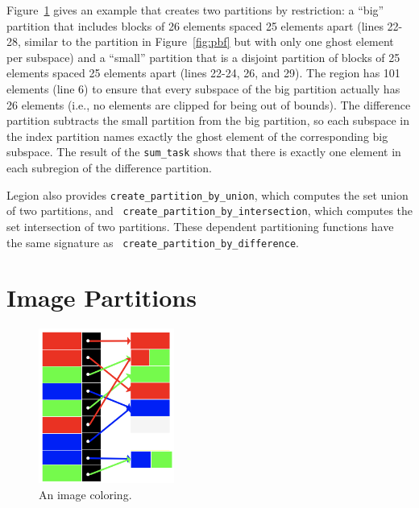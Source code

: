 Figure~\ref{fig:sets} gives an example that creates two partitions by restriction: a ``big'' partition that includes blocks of 26 elements spaced 25 elements apart (lines 22-28, similar to  the partition in Figure~\ref{fig:pbf} but with only one ghost element per subspace) and a ``small'' partition that is a disjoint partition of blocks of 25 elements spaced 25 elements apart (lines 22-24, 26, and 29). The region has 101 elements (line 6) to ensure that every subspace of the big partition actually has 26 elements (i.e., no elements are clipped for being out of bounds).  The difference partition subtracts the small partition from the big partition, so each subspace in the index partition names exactly the ghost element of the corresponding big subspace.  The result of the {\tt sum\_task} shows that there is exactly one element in each subregion of the difference partition.

Legion also provides {\tt create\_partition\_by\_union}, which
computes the set union of two partitions, and {\tt
  create\_partition\_by\_intersection}, which computes the set intersection
of two partitions.  These dependent
partitioning functions have the same signature as {\tt
  create\_partition\_by\_difference}.


\begin{figure}
  {\small
   
  }
  \caption{}
  \label{fig:sets}
\end{figure}


\section{Image Partitions}
\label{sec:image}

\begin{figure}
  \centering
  \includegraphics[height=2in]{figs/image.png}
  \caption{An image coloring.}
  \label{fig:eximage}
\end{figure}

